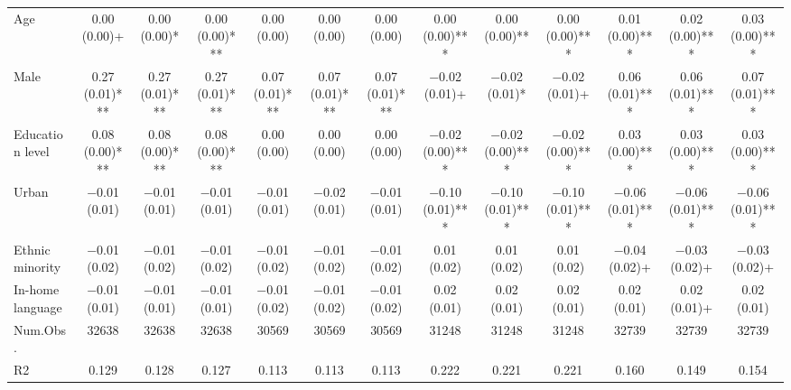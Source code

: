\begin{table}
\begin{tabular}[t]{lcccccccccccc}
Age & \num{0.00} (\num{0.00})+ & \num{0.00} (\num{0.00})* & \num{0.00} (\num{0.00})*** & \num{0.00} (\num{0.00}) & \num{0.00} (\num{0.00}) & \num{0.00} (\num{0.00}) & \num{0.00} (\num{0.00})*** & \num{0.00} (\num{0.00})** & \num{0.00} (\num{0.00})*** & \num{0.01} (\num{0.00})*** & \num{0.02} (\num{0.00})*** & \num{0.03} (\num{0.00})***\\
Male & \num{0.27} (\num{0.01})*** & \num{0.27} (\num{0.01})*** & \num{0.27} (\num{0.01})*** & \num{0.07} (\num{0.01})*** & \num{0.07} (\num{0.01})*** & \num{0.07} (\num{0.01})*** & \num{-0.02} (\num{0.01})+ & \num{-0.02} (\num{0.01})* & \num{-0.02} (\num{0.01})+ & \num{0.06} (\num{0.01})*** & \num{0.06} (\num{0.01})*** & \num{0.07} (\num{0.01})***\\
Education level & \num{0.08} (\num{0.00})*** & \num{0.08} (\num{0.00})*** & \num{0.08} (\num{0.00})*** & \num{0.00} (\num{0.00}) & \num{0.00} (\num{0.00}) & \num{0.00} (\num{0.00}) & \num{-0.02} (\num{0.00})*** & \num{-0.02} (\num{0.00})*** & \num{-0.02} (\num{0.00})*** & \num{0.03} (\num{0.00})*** & \num{0.03} (\num{0.00})*** & \num{0.03} (\num{0.00})***\\
Urban & \num{-0.01} (\num{0.01}) & \num{-0.01} (\num{0.01}) & \num{-0.01} (\num{0.01}) & \num{-0.01} (\num{0.01}) & \num{-0.02} (\num{0.01}) & \num{-0.01} (\num{0.01}) & \num{-0.10} (\num{0.01})*** & \num{-0.10} (\num{0.01})*** & \num{-0.10} (\num{0.01})*** & \num{-0.06} (\num{0.01})*** & \num{-0.06} (\num{0.01})*** & \num{-0.06} (\num{0.01})***\\
Ethnic minority & \num{-0.01} (\num{0.02}) & \num{-0.01} (\num{0.02}) & \num{-0.01} (\num{0.02}) & \num{-0.01} (\num{0.02}) & \num{-0.01} (\num{0.02}) & \num{-0.01} (\num{0.02}) & \num{0.01} (\num{0.02}) & \num{0.01} (\num{0.02}) & \num{0.01} (\num{0.02}) & \num{-0.04} (\num{0.02})+ & \num{-0.03} (\num{0.02})+ & \num{-0.03} (\num{0.02})+\\
In-home language & \num{-0.01} (\num{0.01}) & \num{-0.01} (\num{0.01}) & \num{-0.01} (\num{0.01}) & \num{-0.01} (\num{0.02}) & \num{-0.01} (\num{0.02}) & \num{-0.01} (\num{0.02}) & \num{0.02} (\num{0.01}) & \num{0.02} (\num{0.01}) & \num{0.02} (\num{0.01}) & \num{0.02} (\num{0.01}) & \num{0.02} (\num{0.01})+ & \num{0.02} (\num{0.01})\\
\midrule
Num.Obs. & \num{32638} & \num{32638} & \num{32638} & \num{30569} & \num{30569} & \num{30569} & \num{31248} & \num{31248} & \num{31248} & \num{32739} & \num{32739} & \num{32739}\\
R2 & \num{0.129} & \num{0.128} & \num{0.127} & \num{0.113} & \num{0.113} & \num{0.113} & \num{0.222} & \num{0.221} & \num{0.221} & \num{0.160} & \num{0.149} & \num{0.154}\\

\end{tabular}
\end{table}
